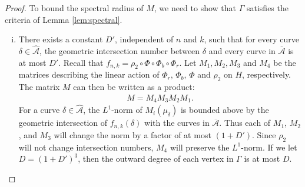 \begin{proof}
To bound the spectral radius of $M$, we need to show that $\Gamma$ satisfies
the criteria of Lemma \ref{lem:spectral}.



\begin{enumerate}[(i)]
\item There exists a constant $D'$, independent of $n$ and $k$, such that for every curve $\delta \in \widehat{\mathcal{A}}$, the geometric
  intersection number between $\delta$ and every curve in $\overline{\mathcal{A}}$ is at most $D'$.
  Recall that $f_{n,k}=\rho_2\circ\Phi\circ\Phi_b\circ\Phi_r$.  Let $M_1,M_2,M_3$ and $M_4$ be the matrices describing the linear action of $\Phi_r,\,\Phi_b,\,\Phi$ and $\rho_2$ on $H$, respectively. The matrix
  $M$ can then be written as a product:
  \begin{align*}
    M = M_4M_3M_2M_1.
  \end{align*}
  For a curve $\delta \in \widehat{\mathcal{A}}$, the $L^1$-norm of $M_i(\mu_\delta)$ is bounded above by the geometric intersection of
  $f_{n,k}(\delta)$ with the curves in $\overline{\mathcal{A}}$.  Thus each of $M_1$, $M_2$, and $M_3$ will change the norm by
  a factor of at most $(1 + D')$. Since $\rho_2$ will not change intersection numbers, $M_4$ will preserve the
  $L^1$-norm. If we let $D = (1 + D')^3$, then the outward degree of each vertex in $\Gamma$ is at most $D$.


\end{enumerate}
\end{proof}
